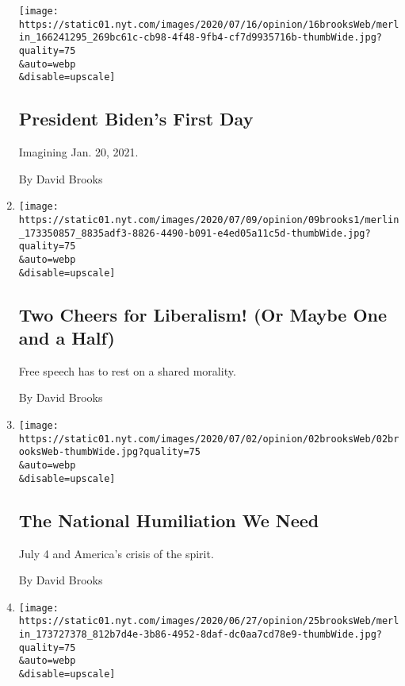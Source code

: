 \begin{enumerate}
  \texttt{[image: https://static01.nyt.com/images/2020/07/16/opinion/16brooksWeb/merlin\_166241295\_269bc61c-cb98-4f48-9fb4-cf7d9935716b-thumbWide.jpg?quality=75\\\&auto=webp\\\&disable=upscale]}

  \hypertarget{president-bidens-first-day}{%
  \subsection{President Biden's First
  Day}\label{president-bidens-first-day}}

  Imagining Jan. 20, 2021.

  By David Brooks
\item
  \href{/2020/07/09/opinion/liberalism-morality.html}{}

  \texttt{[image: https://static01.nyt.com/images/2020/07/09/opinion/09brooks1/merlin\_173350857\_8835adf3-8826-4490-b091-e4ed05a11c5d-thumbWide.jpg?quality=75\\\&auto=webp\\\&disable=upscale]}

  \hypertarget{two-cheers-for-liberalism-or-maybe-one-and-a-half}{%
  \subsection{Two Cheers for Liberalism! (Or Maybe One and a
  Half)}\label{two-cheers-for-liberalism-or-maybe-one-and-a-half}}

  Free speech has to rest on a shared morality.

  By David Brooks
\item
  \href{/2020/07/02/opinion/coronavirus-july-4.html}{}

  \texttt{[image: https://static01.nyt.com/images/2020/07/02/opinion/02brooksWeb/02brooksWeb-thumbWide.jpg?quality=75\\\&auto=webp\\\&disable=upscale]}

  \hypertarget{the-national-humiliation-we-need}{%
  \subsection{The National Humiliation We
  Need}\label{the-national-humiliation-we-need}}

  July 4 and America's crisis of the spirit.

  By David Brooks
\item
  \href{/2020/06/25/opinion/us-coronavirus-protests.html}{}

  \texttt{[image: https://static01.nyt.com/images/2020/06/27/opinion/25brooksWeb/merlin\_173727378\_812b7d4e-3b86-4952-8daf-dc0aa7cd78e9-thumbWide.jpg?quality=75\\\&auto=webp\\\&disable=upscale]}


\end{enumerate}
